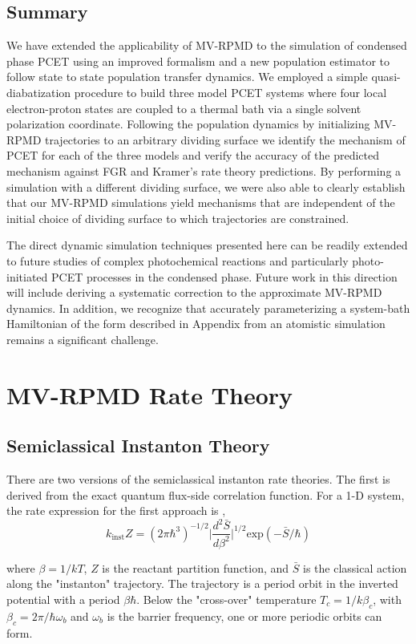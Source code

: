 \documentclass[phd,tocprelim]{cornell}
\begin{document}
\section{Summary}
We have extended the applicability of MV-RPMD 
to the simulation of condensed phase 
PCET using an improved formalism and 
a new population estimator to follow state
to state population transfer dynamics.
We employed a simple quasi-diabatization procedure
to build three model PCET systems where 
four local electron-proton states are coupled
to a thermal bath via a single solvent polarization 
coordinate. Following the population dynamics by 
initializing MV-RPMD trajectories to an arbitrary
dividing surface we identify the mechanism
of PCET for each of the three models and verify
the accuracy of the predicted mechanism against FGR
and Kramer's rate theory predictions. By performing a simulation with 
a different dividing surface, we were also able to clearly
establish that our MV-RPMD simulations yield mechanisms
that are independent of the initial choice of dividing surface
to which trajectories are constrained. 

The direct dynamic simulation techniques presented here 
can be readily extended to future studies of complex 
photochemical reactions and particularly photo-initiated 
PCET processes in the condensed phase. Future work in this 
direction will include deriving a systematic correction to 
the approximate MV-RPMD dynamics. In addition, we recognize
that accurately parameterizing a system-bath Hamiltonian of the 
form described in Appendix from an atomistic 
simulation remains a significant challenge.

\chapter{MV-RPMD Rate Theory}
\section{Semiclassical Instanton Theory }
There are two versions of the semiclassical instanton rate theories. The first is derived from the exact quantum flux-side correlation function. For a 1-D system, the rate expression for the first approach is ,
\begin{equation}
k_{\textrm{inst}} Z= (2\pi\hbar^3)^{-1/2} \bigg|  \frac{d^2 \bar{S}}{d\beta^2}\bigg|^{1/2}  \textrm{exp}(-\bar{S}/\hbar)
\end{equation}

where $\beta = 1/kT$, $Z$ is the reactant partition function, and $\bar{S}$ is the classical action along the "instanton" trajectory. The trajectory is a period orbit in the inverted potential with a period $\beta\hbar$. Below the "cross-over" temperature $T_c =1/k\beta_c$,  with $\beta_c = 2\pi/\hbar \omega_b$ and $\omega_b$ is the barrier frequency, one or more periodic orbits can form. 
\end{document}
